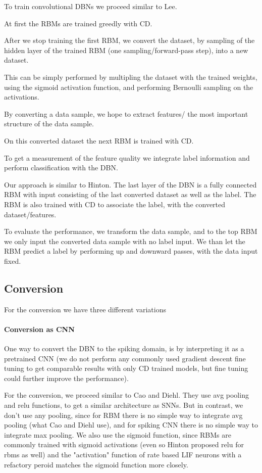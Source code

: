 To train convolutional DBNs we proceed similar to Lee.

At first the RBMs are trained greedly with CD.

After we stop training the first RBM, we convert the dataset, by sampling of the hidden layer of the trained RBM (one sampling/forward-pass step), into a new dataset.

This can be simply performed by multipling the dataset with the trained weights, using the sigmoid activation function, and performing Bernoulli sampling on the activations.

By converting a data sample, we hope to extract features/ the most important structure of the data sample.

On this converted dataset the next RBM is trained with CD.

To get a measurement of the feature quality we integrate label information and  perform classification with the DBN.

Our approach is similar to Hinton. 
The last layer of the DBN is a fully connected RBM with input consisting of the last converted dataset as well as the label.
The RBM is also trained with CD to associate the label, with the converted dataset/features.

To evaluate the performance, we transform the data sample, and to the top RBM we only input the converted data sample with no label input.
We than let the RBM predict a label by performing up and downward passes, with the data input fixed.


\subsection{Conversion}

For the conversion we have three different variations

\paragraph{Conversion as CNN} 

One way to convert the DBN to the spiking domain, is by interpreting it as a pretrained CNN (we do not perform any commonly used gradient descent fine tuning to get comparable results with only CD trained models, but fine tuning could further improve the performance).

For the conversion, we proceed similar to Cao and Diehl.
They use avg pooling and relu functions, to get a similar architecture as SNNs.
But in contrast, we don't use any pooling, since for RBM there is no simple way to integrate avg pooling (what Cao and Diehl use), and for spiking CNN there is no simple way to integrate max pooling.
We also use the sigmoid function, since RBMs are commonly trained with sigmoid activations (even so Hinton proposed relu for rbms as well) and the "activation" function of rate based LIF neurons with a refactory peroid matches the sigmoid function more closely.

